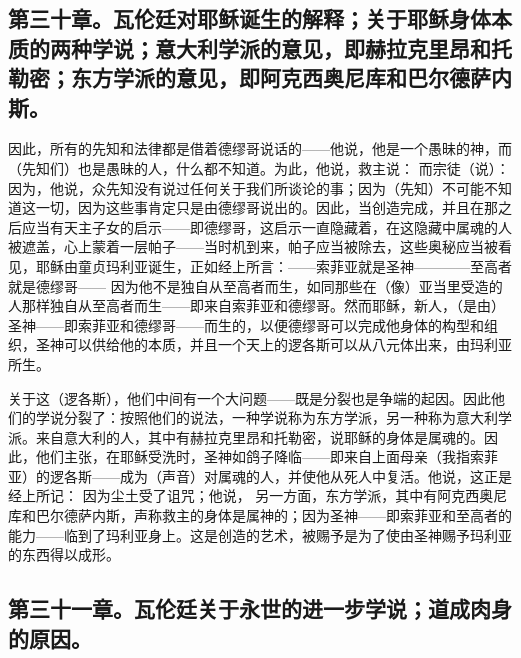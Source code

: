 
\subsection{第三十章。瓦伦廷对耶稣诞生的解释；关于耶稣身体本质的两种学说；意大利学派的意见，即赫拉克里昂和托勒密；东方学派的意见，即阿克西奥尼库和巴尔德萨内斯。}

因此，所有的先知和法律都是借着德缪哥说话的——他说，他是一个愚昧的神，而（先知们）也是愚昧的人，什么都不知道。为此，他说，救主说：  而宗徒（说）：  因为，他说，众先知没有说过任何关于我们所谈论的事；因为（先知）不可能不知道这一切，因为这些事肯定只是由德缪哥说出的。因此，当创造完成，并且在那之后应当有天主子女的启示——即德缪哥，这启示一直隐藏着，在这隐藏中属魂的人被遮盖，心上蒙着一层帕子——当时机到来，帕子应当被除去，这些奥秘应当被看见，耶稣由童贞玛利亚诞生，正如经上所言：——索菲亚就是圣神————至高者就是德缪哥——  因为他不是独自从至高者而生，如同那些在（像）亚当里受造的人那样独自从至高者而生——即来自索菲亚和德缪哥。然而耶稣，新人，（是由）圣神——即索菲亚和德缪哥——而生的，以便德缪哥可以完成他身体的构型和组织，圣神可以供给他的本质，并且一个天上的逻各斯可以从八元体出来，由玛利亚所生。\par

关于这（逻各斯），他们中间有一个大问题——既是分裂也是争端的起因。因此他们的学说分裂了：按照他们的说法，一种学说称为东方学派，另一种称为意大利学派。来自意大利的人，其中有赫拉克里昂和托勒密，说耶稣的身体是属魂的。因此，他们主张，在耶稣受洗时，圣神如鸽子降临——即来自上面母亲（我指索菲亚）的逻各斯——成为（声音）对属魂的人，并使他从死人中复活。他说，这正是经上所记：  因为尘土受了诅咒；他说，  另一方面，东方学派，其中有阿克西奥尼库和巴尔德萨内斯，声称救主的身体是属神的；因为圣神——即索菲亚和至高者的能力——临到了玛利亚身上。这是创造的艺术，被赐予是为了使由圣神赐予玛利亚的东西得以成形。\par


\subsection{第三十一章。瓦伦廷关于永世的进一步学说；道成肉身的原因。}

